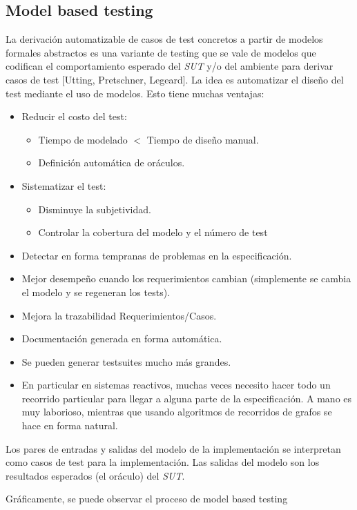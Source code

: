 \documentclass[]{article}
\begin{document}
\subsection{Model based testing}
La derivación automatizable de casos de test concretos a partir de modelos formales abstractos es una variante de testing que se vale de modelos que codifican el comportamiento esperado del \textit{SUT} y/o del ambiente para derivar casos de test [Utting, Pretschner, Legeard]. La idea es automatizar el diseño del test mediante el uso de modelos. Esto tiene muchas ventajas:
\begin{itemize}
	\item Reducir el costo del test:
	\begin{itemize}
		\item Tiempo de modelado $<$ Tiempo de diseño manual.
		\item Definición automática de oráculos.
	\end{itemize}
	\item Sistematizar el test:
	\begin{itemize}
		\item Disminuye la subjetividad.
		\item Controlar la cobertura del modelo y el número de test
	\end{itemize}
	\item Detectar en forma tempranas de problemas en la especificación.
	\item Mejor desempeño cuando los requerimientos cambian (simplemente se cambia el modelo y se regeneran los tests).
	\item Mejora la trazabilidad Requerimientos/Casos.
	\item Documentación generada en forma automática.
	\item Se pueden generar testsuites mucho más grandes.
	\item En particular en sistemas reactivos, muchas veces necesito hacer todo un recorrido particular para llegar a alguna parte de la especificación. A mano es muy laborioso, mientras que usando algoritmos de recorridos de grafos se hace en forma natural.
\end{itemize}

Los pares de entradas y salidas del modelo de la implementación se interpretan como casos de test para la implementación. Las salidas del modelo son los resultados esperados (el oráculo) del \textit{SUT}.

Gráficamente, se puede observar el proceso de model based testing
\end{document}
